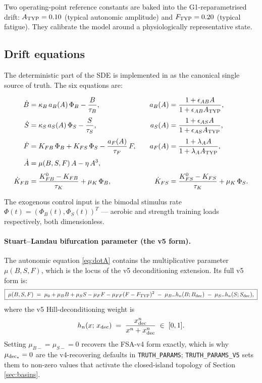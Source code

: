 \documentclass[11pt,a4paper]{article}
\theoremstyle{definition}
\begin{document}
Two operating-point reference constants are baked into the
G1-reparametrised drift: $A_{\rm TYP} = 0.10$ (typical autonomic
amplitude) and $F_{\rm TYP} = 0.20$ (typical fatigue). They calibrate
the model around a physiologically representative state.

\subsection{Drift equations} \label{sec:drift}

The deterministic part of the SDE is implemented in
 as the canonical
single source of truth. The six equations are:

\begin{align}
\dot B    &= \kappa_B \, a_B(A) \, \Phi_B - \frac{B}{\tau_B},
   \quad &
   a_B(A) &= \frac{1 + \epsilon_{AB} A}{1 + \epsilon_{AB} A_{\rm TYP}}, \\[3pt]
\dot S    &= \kappa_S \, a_S(A) \, \Phi_S - \frac{S}{\tau_S},
   \quad &
   a_S(A) &= \frac{1 + \epsilon_{AS} A}{1 + \epsilon_{AS} A_{\rm TYP}}, \\[3pt]
\dot F    &= K_{FB}\, \Phi_B + K_{FS}\, \Phi_S - \frac{a_F(A)}{\tau_F}\, F,
   \quad &
   a_F(A) &= \frac{1 + \lambda_A A}{1 + \lambda_A A_{\rm TYP}}, \\[3pt]
\dot A    &= \mu(B, S, F)\,A - \eta\, A^3, \label{eq:dotA}\\[3pt]
\dot K_{FB} &= \frac{K_{FB}^0 - K_{FB}}{\tau_K} + \mu_K\, \Phi_B,
   \quad &
   \dot K_{FS} &= \frac{K_{FS}^0 - K_{FS}}{\tau_K} + \mu_K\, \Phi_S.
\end{align}

The exogenous control input is the bimodal stimulus rate
$\Phi(t) = (\Phi_B(t), \Phi_S(t))^T$ --- aerobic and strength training
loads respectively, both dimensionless.

\paragraph{Stuart--Landau bifurcation parameter (the v5 form).}
The autonomic equation \eqref{eq:dotA} contains the multiplicative
parameter $\mu(B, S, F)$, which is the locus of the v5 deconditioning
extension. Its full v5 form is:
\begin{equation}
\boxed{\;
\mu(B, S, F) \;=\; \mu_0 + \mu_B B + \mu_S S - \mu_F F - \mu_{FF}(F - F_{\rm TYP})^2
   \;-\; \mu_{B-} h_n(B; B_{\rm dec})
   \;-\; \mu_{S-} h_n(S; S_{\rm dec}),
\;}
\label{eq:mu-v5}
\end{equation}
where the v5 Hill-deconditioning weight is
\begin{equation}
h_n(x;\, x_{\rm dec}) \;=\; \frac{x_{\rm dec}^n}{x^n + x_{\rm dec}^n} \;\in\; [0, 1].
\label{eq:hill}
\end{equation}
Setting $\mu_{B-} = \mu_{S-} = 0$ recovers the FSA-v4 form exactly,
which is why $\mu_{\rm dec_*} = 0$ are the v4-recovering defaults in
\texttt{TRUTH\_PARAMS}; \texttt{TRUTH\_PARAMS\_V5} sets them to non-zero
values that activate the closed-island topology of Section
\ref{sec:basins}.
\end{document}
